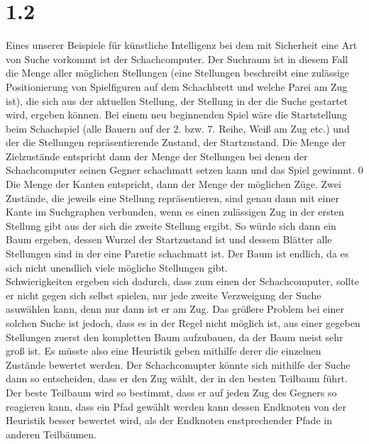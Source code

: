 \documentclass[a4paper,11pt,fleqn]{scrartcl}
\begin{document}
\section*{1.2}
Eines unserer Beispiele für künstliche Intelligenz bei dem mit Sicherheit eine Art von Suche vorkommt ist der Schachcomputer. Der Suchraum ist in diesem Fall die Menge aller möglichen Stellungen (eine Stellungen beschreibt eine zulässige Positionierung von Spielfiguren auf dem Schachbrett und welche Parei am Zug ist), die sich aus der aktuellen Stellung, der Stellung in der die Suche gestartet wird, ergeben können. 
Bei einem neu beginnenden Spiel wäre die Startstellung beim Schachspiel (alle Bauern auf der 2. bzw. 7. Reihe, Weiß am Zug etc.) und der die Stellungen repräsentierende Zustand, der Startzustand. Die Menge der Zielzustände entspricht dann der Menge der Stellungen bei denen der Schachcomputer seinen Gegner schachmatt setzen kann und das Spiel gewinnnt. 0
Die Menge der Kanten entspricht, dann der Menge der möglichen Züge. Zwei Zustände, die jeweils eine Stellung repräsentieren, sind genau dann mit einer Kante im Suchgraphen verbunden, wenn es einen zulässigen Zug in der ersten Stellung gibt aus der sich die zweite Stellung ergibt. So würde sich dann ein Baum ergeben, dessen Wurzel der Startzustand ist und dessem Blätter alle Stellungen sind in der eine Paretie schachmatt ist. Der Baum ist endlich, da es sich nicht unendlich viele mögliche Stellungen gibt.\\
Schwierigkeiten ergeben sich dadurch, dass zum einen der Schachcomputer, sollte er nicht gegen sich selbst spielen, nur jede zweite Verzweigung der Suche asuwählen kann, denn nur dann ist er am Zug. Das größere Problem bei einer solchen Suche ist jedoch, dass es in der Regel nicht möglich ist, aus einer gegeben Stellungen zuerst den kompletten Baum aufzubauen, da der Baum meist sehr groß ist. Es müsste also eine Heuristik geben mithilfe derer die einzelnen Zustände bewertet werden. Der Schachcomupter könnte sich mithilfe der Suche dann so entscheiden, dass er den Zug wählt, der in den besten Teilbaum führt. Der beste Teilbaum wird so bestimmt, dass er auf jeden Zug des Gegners so reagieren kann, dass ein Pfad gewählt werden kann dessen Endknoten von der Heuristik besser bewertet wird, als der Endknoten enstprechender Pfade in anderen Teilbäumen.
\end{document}
